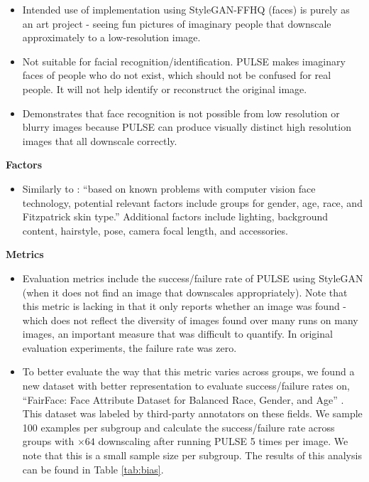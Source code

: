 \documentclass[10pt,twocolumn,letterpaper]{article}
\begin{document}
\begin{figure*}[ht]
\begin{tcolorbox}[
    sharp corners,
    colback=white,
    colframe=black
    ]
\begin{itemize}
    \item Intended use of implementation using StyleGAN-FFHQ (faces) is purely as an art project - seeing fun pictures of imaginary people that downscale approximately to a low-resolution image.
    \item Not suitable for facial recognition/identification. PULSE makes imaginary faces of people who do not exist, which should not be confused for real people. It will not help identify or reconstruct the original image.
    \item Demonstrates that face recognition is not possible from low resolution or blurry images because PULSE can produce visually distinct high resolution images that all downscale correctly.
\end{itemize}
\textbf{Factors}
\begin{itemize}
    \item Similarly to \cite{modelcards}: ``based on known problems with computer vision face technology, potential relevant factors include groups for gender, age, race, and Fitzpatrick skin type.'' Additional factors include lighting, background content, hairstyle, pose, camera focal length, and accessories.
\end{itemize}
\textbf{Metrics}
\begin{itemize}
    \item Evaluation metrics include the success/failure rate of PULSE using StyleGAN (when it does not find an image that downscales appropriately). Note that this metric is lacking in that it only reports whether an image was found - which does not reflect the diversity of images found over many runs on many images, an important measure that was difficult to quantify. In original evaluation experiments, the failure rate was zero.
    
    \item To better evaluate the way that this metric varies across groups, we found a new dataset with better representation to evaluate success/failure rates on, ``FairFace: Face Attribute Dataset for Balanced Race, Gender, and Age'' \cite{fairface}. This dataset was labeled by third-party annotators on these fields. We sample 100 examples per subgroup and calculate the success/failure rate across groups with $\times64$ downscaling after running PULSE 5 times per image. We note that this is a small sample size per subgroup. The results of this analysis can be found in Table \ref{tab:bias}.


\end{itemize}
\end{tcolorbox}
\end{figure*}
\end{document}
